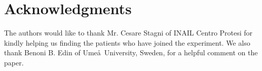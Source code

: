 \documentclass[review,authoryear]{elsarticle}
\begin{document}
\section*{Acknowledgments}

The authors would like to thank Mr. Cesare Stagni of INAIL Centro
Protesi for kindly helping us finding the patients who have joined the
experiment. We also thank Benoni B. Edin of Ume\aa\ University,
Sweden, for a helpful comment on the paper.



\end{document}
